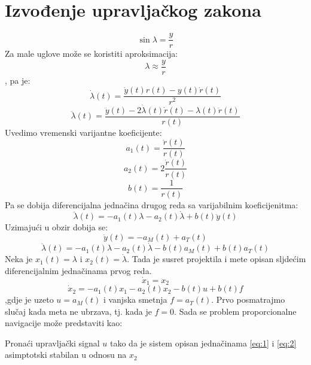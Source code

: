 \section{Izvođenje upravljačkog zakona}
\begin{equation}
    \sin{\lambda}=\frac{y}{r}
\end{equation}
Za male uglove može se koristiti aproksimacija:
\begin{equation}
    \lambda \approx \frac{y}{r}
\end{equation}
, pa je:
\begin{equation}
    \dot{\lambda}(t)=\frac{\dot{y}(t)r(t)-y(t)\dot{r}(t)}{r^2}
\end{equation}
\begin{equation}
    \ddot{\lambda}(t)=\frac{\ddot{y}(t)-2\dot{\lambda}(t)\dot{r}(t)-\lambda(t)\ddot{r}(t)}{r(t)}
\end{equation}
Uvedimo vremenski varijantne koeficijente:
\begin{equation}
    a_1(t)=\frac{\ddot{r}(t)}{r(t)}
\end{equation}
\begin{equation}
    a_2(t)=2\frac{\dot{r}(t)}{r(t)}
\end{equation}
\begin{equation}
    b(t)=\frac{1}{r(t)}
\end{equation}
Pa se dobija diferencijalna jednačina drugog reda sa varijabilnim koeficijenitma:
\begin{equation}
    \ddot{\lambda}(t)=-a_1(t)\lambda-a_2(t)\dot{\lambda}+b(t)\ddot{y}(t)
\end{equation}
Uzimajući u obzir dobija se:
\begin{equation}
    \ddot{y}(t)=-a_M(t)+a_T(t)
\end{equation}
\begin{equation}
    \ddot{\lambda}(t)=-a_1(t)\lambda-a_2(t)\dot{\lambda}-b(t)a_M(t)+b(t)a_T(t)
\end{equation}
Neka je $x_1(t)=\lambda$ i $x_2(t)=\dot{\lambda}$. Tada je susret projektila i mete opisan sljdećim diferencijalnim jednačinama prvog reda.
\begin{equation}
    \dot{x}_1=x_2
    \label{eq:1}
\end{equation}
\begin{equation}
    \dot{x}_2=-a_1(t)x_1-a_2(t)x_2-b(t)u+b(t)f
    \label{eq:2}
\end{equation}
,gdje je uzeto $u=a_M(t)$ i vanjska smetnja $f=a_T(t)$.
Prvo posmatrajmo slučaj kada meta ne ubrzava, tj. kada je $f=0$. Sada se problem proporcionalne navigacije može predstaviti kao:
\begin{tcolorbox}
    Pronaći upravljački signal $u$ tako da je sistem opisan jednačinama \ref{eq:1} i \ref{eq:2} asimptotski stabilan u odnosu na $x_2$
\end{tcolorbox}

